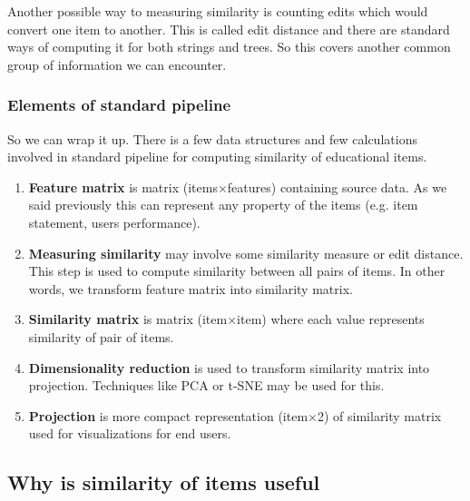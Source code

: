 \documentclass[
  digital, %
  table,   %
  nolof,     %
  nolot,     %
  nocover
]{fithesis3}
\begin{document}

Another possible way to measuring similarity is counting edits which would convert one item to another. This is called edit distance and there are standard ways of computing it for both strings and trees. So this covers another common group of information we can encounter.

\subsubsection{Elements of standard pipeline}\label{elements-of-standard-pipeline}

So we can wrap it up. There is a few data structures and few calculations involved in standard pipeline for computing similarity of educational items.

\begin{enumerate}
  \item \textbf{Feature matrix} is matrix (items$\times$features) containing source data. As we said previously this can represent any property of the items (e.g. item statement, users performance).

  \item\textbf{Measuring similarity} may involve some similarity measure or edit distance. This step is used to compute similarity between all pairs of items. In other words, we transform feature matrix into similarity matrix.

  \item\textbf{Similarity matrix} is matrix (item$\times$item) where each value represents similarity of pair of items.

  \item\textbf{Dimensionality reduction} is used to transform similarity matrix into projection. Techniques like PCA or t-SNE may be used for this.

  \item\textbf{Projection} is more compact representation (item$\times$2) of similarity matrix used for visualizations for end users.
\end{enumerate}

\subsection{Why is similarity of items useful}\label{why-is-similarity-of-items-useful}

\end{document}
